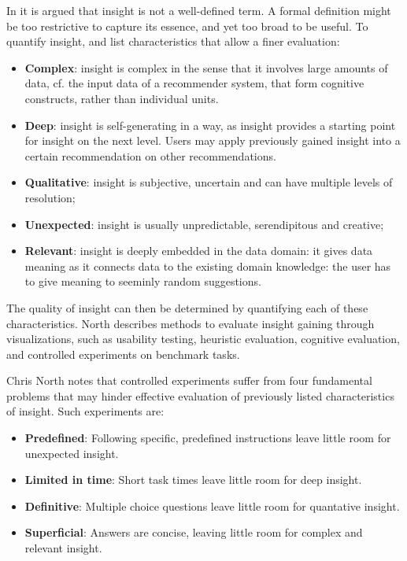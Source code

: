 In \cite{north:2006} it is argued that insight is not a well-defined term. A formal definition might be too restrictive to capture its essence, and yet too broad to be useful. To quantify insight, \cite{north:2006} and \cite{yi:2008} list characteristics that allow a finer evaluation:

\begin{itemize}
	\item \textbf{Complex}: insight is complex in the sense that it involves large amounts of data, cf. the input data of a recommender system, that form cognitive constructs, rather than individual units.
	\item \textbf{Deep}: insight is self-generating in a way, as insight provides a starting point for insight on the next level. Users may apply previously gained insight into a certain recommendation on other recommendations.
	\item \textbf{Qualitative}: insight is subjective, uncertain and can have multiple levels of resolution;
	\item \textbf{Unexpected}: insight is usually unpredictable, serendipitous and creative;
	\item \textbf{Relevant}: insight is deeply embedded in the data domain: it gives data meaning as it connects data to the existing domain knowledge: the user has to give meaning to seeminly random suggestions.
\end{itemize}

The quality of insight can then be determined by quantifying each of these characteristics\cite{north:2006}. North describes methods to evaluate insight gaining through visualizations, such as usability testing, heuristic evaluation, cognitive evaluation, and controlled experiments on benchmark tasks\cite{north:2006}.

Chris North notes that controlled experiments suffer from four fundamental problems that may hinder effective evaluation of previously listed characteristics of insight. Such experiments are\cite{north:2006}:

\begin{itemize}
	\item \textbf{Predefined}: Following specific, predefined instructions leave little room for unexpected insight.
	\item \textbf{Limited in time}: Short task times leave little room for deep insight.
	\item \textbf{Definitive}: Multiple choice questions leave little room for quantative insight.
	\item \textbf{Superficial}: Answers are concise, leaving little room for complex and relevant insight.
\end{itemize}

